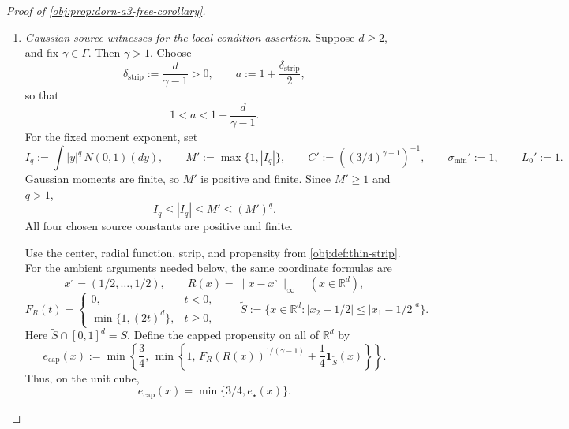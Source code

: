 \documentclass[11pt]{article}
\begin{document}
\begin{proof}[Proof of \cref{obj:prop:dorn-a3-free-corollary}]
\begin{enumerate}
Every admissible radius bounds the function itself. Taking the infimum of those bounds gives
\[
|g(x)|\le \|g\|_{\mathcal H^\beta},
\qquad x\in[0,1]^d.
\]
Constant functions satisfy the source seminorm restriction because their derivative differences vanish. Applying the preceding inequality to the constant functions \(1\) and \(M\), which admit radii by the completion result, yields
\[
1\le \|1\|_{\mathcal H^\beta},
\qquad
M\le \|M\|_{\mathcal H^\beta}.
\]
The constant function \(1\), with amplitude and seminorm bounds both equal to \(1\), is admissible in the definition of \(C_{d,\beta}\). The constant function \(M\) is admissible in the definition of \(L_*\). Hence
\[
0<\frac12\le C_{d,\beta}\le K_{d,\beta}<\infty,
\qquad
0<M\le L_*.
\]
Finally, every function contributing to \(L_*\) also contributes, after normalization, to \(C_{d,\beta}\):
\[
\frac{\|u\circ T\|_{\mathcal H^\beta}}{M+L_0}
\le C_{d,\beta}.
\]
Taking the supremum over these functions proves
\[
0<L_*\le C_{d,\beta}(M+L_0)<\infty.
\]

\item \emph{Gaussian source witnesses for the local-condition assertion.}
Suppose \(d\ge2\), and fix \(\gamma\in\Gamma\). Then \(\gamma>1\). Choose
\[
\delta_{\mathrm{strip}}:=\frac{d}{\gamma-1}>0,
\qquad
a:=1+\frac{\delta_{\mathrm{strip}}}{2},
\]
so that
\[
1<a<1+\frac{d}{\gamma-1}.
\]
For the fixed moment exponent, set
\[
I_q:=\int |y|^q\,N(0,1)(dy),
\qquad
M':=\max\{1,|I_q|\},
\qquad
C':=\left((3/4)^{\gamma-1}\right)^{-1},
\qquad
\sigma_{\min}':=1,
\qquad
L_0':=1.
\]
Gaussian moments are finite, so \(M'\) is positive and finite. Since \(M'\ge1\) and \(q>1\),
\[
I_q\le |I_q|\le M'\le (M')^q.
\]
All four chosen source constants are positive and finite.

Use the center, radial function, strip, and propensity from
\cref{obj:def:thin-strip}. For the ambient arguments needed below, the same coordinate formulas are
\[
x^\circ=(1/2,\ldots,1/2),
\qquad
R(x)=\|x-x^\circ\|_\infty
\quad(x\in\mathbb R^d),
\]
\[
F_R(t)=
\begin{cases}
0,&t<0,\\
\min\{1,(2t)^d\},&t\ge0,
\end{cases}
\qquad
\widetilde S:=
\{x\in\mathbb R^d:
|x_2-1/2|\le |x_1-1/2|^a\}.
\]
Here \(\widetilde S\cap[0,1]^d=S\). Define the capped propensity on all of \(\mathbb R^d\) by
\[
e_{\mathrm{cap}}(x)
:=
\min\left\{\frac34,\,
\min\left\{1,\,
F_R(R(x))^{1/(\gamma-1)}
+\frac14\mathbf1_{\widetilde S}(x)\right\}\right\}.
\]
Thus, on the unit cube,
\[
e_{\mathrm{cap}}(x)=\min\{3/4,e_\star(x)\}.
\]


\end{enumerate}
\end{proof}
\end{document}
